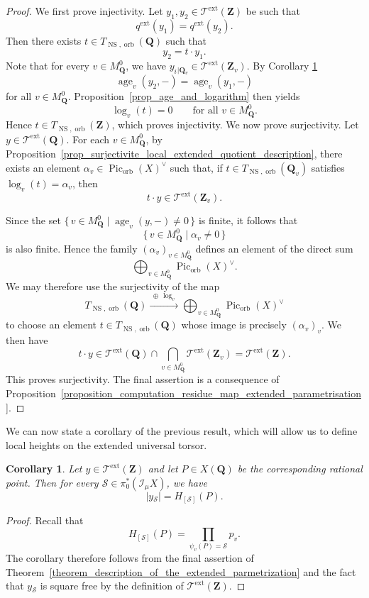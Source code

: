 \documentclass{proc-l}
\newcommand{\Z}{\mathbf{Z}}
\newcommand{\Q}{\mathbf{Q}}
\DeclareMathOperator{\Pic}{Pic}
\DeclareMathOperator{\age}{age}
\DeclareMathOperator{\NS}{NS}
\DeclareMathOperator{\orb}{orb}
\DeclareMathOperator{\ext}{ext}
\newcommand{\stackS}{\mathcal{S}}
\newcommand{\stackT}{\mathcal{T}}
\newcommand{\sheafI}{\mathcal{I}}
\newcommand{\twistsector}{\pi_0^*(\sheafI_{\mu} X)}
\newtheorem{cor}[theorem]{Corollary}
\theoremstyle{definition}
\theoremstyle{remark}
\numberwithin{equation}{section}
\begin{document}
\begin{proof}
  We first prove injectivity. Let $y_1, y_2 \in \stackT^{\ext}(\Z)$ be such that
$$q^{\ext}(y_1) = q^{\ext}(y_2) .$$Then there exists $t \in T_{\NS,\orb}(\Q)$ such that
\[
y_2 = t \cdot y_1 .
\]
Note that for every $v \in M_{\Q}^{0}$, we have
$y_i{}_{|\Q_v} \in \stackT^{\ext}(\Z_v)$. By Corollary \ref{corollary_description_extended_parametrization}
\[
\age_v(y_2,-) = \age_v(y_1,-)
\]
for all $v \in M_{\Q}^{0}$. Proposition~\ref{prop_age_and_logarithm} then yields
\[
\log_v(t) = 0
\qquad \text{for all } v \in M_{\Q}^{0}.
\]
Hence $t \in T_{\NS,\orb}(\Z)$, which proves injectivity. We now prove surjectivity. Let $y \in \stackT^{\ext}(\Q)$. For each
$v \in M_{\Q}^{0}$, by Proposition~\ref{prop_surjectivite_local_extended_quotient_description},
there exists an element $\alpha_v \in \Pic_{\orb}(X)^{\vee}$ such that, if
$t \in T_{\NS,\orb}(\Q_v)$ satisfies $\log_v(t) = \alpha_v$, then
\[
t \cdot y \in \stackT^{\ext}(\Z_v).
\]

Since the set $\{\, v \in M_{\Q}^0 \mid \age_v(y,-) \neq 0 \,\}$ is finite, it follows that
$$\{\, v \in M_{\Q}^0 \mid \alpha_v \neq 0 \,\}$$is also finite. Hence the family
$(\alpha_v)_{v \in M_{\Q}^0}$ defines an element of the direct sum
\[
\bigoplus_{v \in M_{\Q}^{0}} \Pic_{\orb}(X)^{\vee}.
\]
We may therefore use the surjectivity of the map
\[
T_{\NS,\orb}(\Q)
\xrightarrow{\ \oplus\,\log_v\ }
\bigoplus_{v \in M_{\Q}^{0}} \Pic_{\orb}(X)^{\vee}
\]
to choose an element $t \in T_{\NS,\orb}(\Q)$ whose image is precisely
$(\alpha_v)_v$. We then have
\[
t \cdot y \in
\stackT^{\ext}(\Q)
\cap
\bigcap_{v \in M_{\Q}^{0}} \stackT^{\ext}(\Z_v)
=
\stackT^{\ext}(\Z).
\]
This proves surjectivity. The final assertion is a consequence of
Proposition~\ref{proposition_computation_residue_map_extended_parametrisation}.

\end{proof}

We can now state a corollary of the previous result, which will allow us to define
local heights on the extended universal torsor.

\begin{cor}\label{corollary_description_extended_parametrization}
Let $y \in \stackT^{\ext}(\Z)$ and let $P \in X(\Q)$ be the corresponding rational
point. Then for every $\stackS \in \twistsector$, we have
\[
|y{}_{\stackS}| = H_{[\stackS]}(P) .
\]
\end{cor}

\begin{proof}
    Recall that
\[
H_{[\stackS]}(P) = \prod_{\psi_v(P) = \stackS} p_v .
\]
The corollary therefore follows from the final assertion of
Theorem~\ref{theorem_description_of_the_extended_parmetrization} and the fact that $y{}_{\stackS}$ is square free by the definition of $\stackT^{\ext}(\Z)$.

\end{proof}
\end{document}
